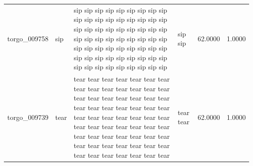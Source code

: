 \begin{table}
\begin{tabular}{llllrr}
torgo_009758 & sip & sip sip sip sip sip sip sip sip sip sip sip sip sip sip sip sip sip sip sip sip sip sip sip sip sip sip sip sip sip sip sip sip sip sip sip sip sip sip sip sip sip sip sip sip sip sip sip sip sip sip sip sip sip sip sip sip sip sip sip sip sip sip sip & sip sip & 62.0000 & 1.0000 \\
torgo_009739 & tear & tear tear tear tear tear tear tear tear tear tear tear tear tear tear tear tear tear tear tear tear tear tear tear tear tear tear tear tear tear tear tear tear tear tear tear tear tear tear tear tear tear tear tear tear tear tear tear tear tear tear tear tear tear tear tear tear tear tear tear tear tear tear tear & tear tear & 62.0000 & 1.0000 \\
\bottomrule
\end{tabular}
\end{table}
